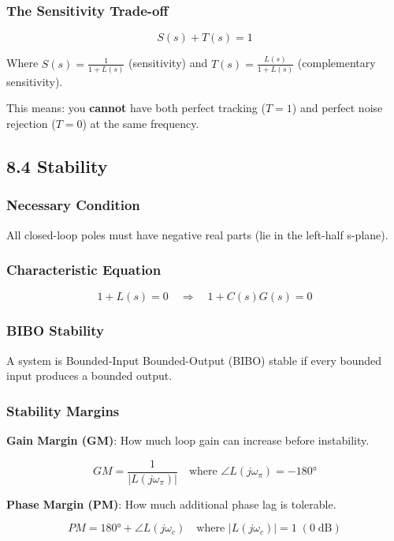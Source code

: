 \documentclass[11pt,a4paper]{book}
\begin{document}
\subsubsection{The Sensitivity Trade-off}

\[\boxed{S(s) + T(s) = 1}\]

Where $S(s) = \frac{1}{1+L(s)}$ (sensitivity) and $T(s) = \frac{L(s)}{1+L(s)}$ (complementary sensitivity).

This means: you \textbf{cannot} have both perfect tracking ($T = 1$) and perfect noise rejection ($T = 0$) at the same frequency.

\medskip\noindent\hrulefill\medskip

\subsection{8.4 Stability}

\subsubsection{Necessary Condition}
All closed-loop poles must have negative real parts (lie in the left-half s-plane).

\subsubsection{Characteristic Equation}
\[1 + L(s) = 0 \quad \Rightarrow \quad 1 + C(s)G(s) = 0\]

\subsubsection{BIBO Stability}
A system is Bounded-Input Bounded-Output (BIBO) stable if every bounded input produces a bounded output.

\subsubsection{Stability Margins}

\textbf{Gain Margin (GM)}: How much loop gain can increase before instability.

\[GM = \frac{1}{|L(j\omega_\pi)|} \quad \text{where } \angle L(j\omega_\pi) = -180°\]

\textbf{Phase Margin (PM)}: How much additional phase lag is tolerable.

\[PM = 180° + \angle L(j\omega_c) \quad \text{where } |L(j\omega_c)| = 1 \;(0\;\text{dB})\]
\end{document}
